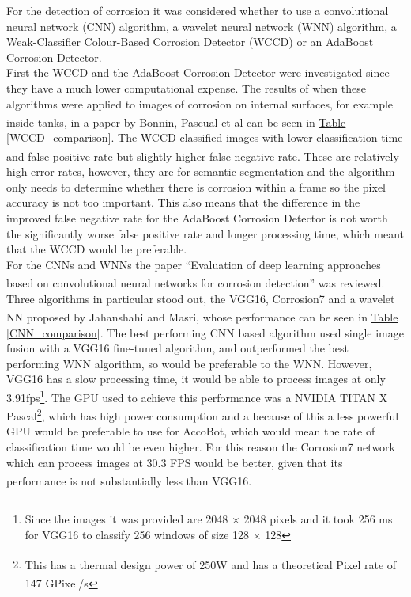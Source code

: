 \documentclass[11pt]{article}		%
\newcommand{\supercite}[1]{\textsuperscript{\cite{#1}}}		%
\newcommand{\tableref}[1]{\hyperref[#1]{Table \ref*{#1}}}     %
\begin{document}
        For the detection of corrosion it was considered whether to use a convolutional neural network (CNN) algorithm, a wavelet neural network (WNN) algorithm, a Weak-Classifier Colour-Based Corrosion Detector (WCCD) or an AdaBoost Corrosion Detector.
        \\
        \hspace*{2ex}First the WCCD and the AdaBoost Corrosion Detector were investigated since they have a much lower computational expense. The results of when these algorithms were applied to images of corrosion on internal surfaces, for example inside tanks, in a paper by Bonnin, Pascual et al\supercite{WCCD} can be seen in \tableref{WCCD_comparison}. The WCCD classified images with lower classification time and false positive rate but slightly higher false negative rate\supercite{WCCD}. These are relatively high error rates, however, they are for semantic segmentation and the algorithm only needs to determine whether there is corrosion within a frame so the pixel accuracy is not too important. This also means that the difference in the improved false negative rate for the AdaBoost Corrosion Detector is not worth the significantly worse false positive rate and longer processing time, which meant that the WCCD would be preferable.
        \\
        \hspace*{2ex}For the CNNs and WNNs the paper “Evaluation of deep learning approaches based on convolutional neural networks for corrosion detection”\supercite{Corrosion7}  was reviewed. Three algorithms in particular stood out, the VGG16, Corrosion7 and a wavelet NN proposed by Jahanshahi and Masri\supercite{WNN}, whose performance can be seen in \tableref{CNN_comparison}.  The best performing CNN based algorithm used single image fusion with a VGG16 fine-tuned algorithm, and  outperformed the best performing WNN algorithm, so would be preferable to the WNN. However, VGG16 has a slow processing time, it would be able to process images at only 3.91fps\footnote{Since the images it was provided are 2048 $\times$ 2048 pixels and it took 256 ms for VGG16 to classify 256 windows of size 128 $\times$ 128}. The GPU used to achieve this performance was a NVIDIA TITAN X Pascal\footnote{This has a thermal design power of 250W\supercite{Nvidia_Titan} and has a theoretical Pixel rate of 147 GPixel/s\supercite{Corrosion7}}, which has high power consumption and a because of this a less powerful GPU would be preferable to use for AccoBot, which would mean the rate of classification time would be even higher. For this reason the Corrosion7 network which can process images at 30.3 FPS would be better, given that its performance is not substantially less than VGG16\supercite{Corrosion7}.
\end{document}
